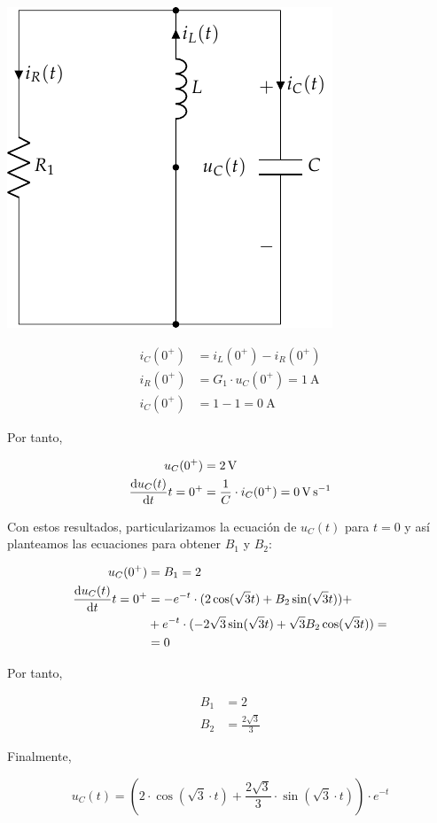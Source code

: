 \documentclass[12pt]{article}
\begin{document}
\begin{minipage}{0.3\textwidth}
\includegraphics[scale=0.8]{figs/FM_4_9_natural}
\end{minipage}
\begin{minipage}{0.7\textwidth}
\begin{align*}
  i_C(0^+) &= i_L(0^+) - i_R(0^+)\\
  i_R(0^+) &= G_1 \cdot u_C(0^+) = \SI{1}{\ampere}\\
  i_C(0^+) &= 1 - 1 = \SI{0}{\ampere}
\end{align*}
\end{minipage}

\bigskip

Por tanto,

\begin{align*}
  u_C(0^+) &= \SI{2}{\volt}\\
  \diff{u_C(t)}{t}{t = 0^+} &= \frac{1}{C} \cdot i_C(0^+) = \SI{0}{\volt\per\second}
\end{align*}

Con estos resultados, particularizamos la ecuación de $u_C(t)$ para $t = 0$ y así planteamos las ecuaciones para obtener $B_1$ y $B_2$:

\begin{align*}
  u_C(0^+) &= B_1 = 2\\
  \diff{u_C(t)}{t}{t = 0^+} &= -e^{-t} \cdot (2\cos(\sqrt{3}t) + B_2\sin(\sqrt{3}t)) +\\
           &+ e^{-t} \cdot (-2\sqrt{3}\sin(\sqrt{3}t) + \sqrt{3} B_2\cos(\sqrt{3}t)) =\\
           &= 0
\end{align*}

Por tanto,

\begin{align*}
  B_1 &= 2\\
  B_2 &= \frac{2\sqrt{3}}{3}
\end{align*}

Finalmente,

\begin{equation*}
  u_C(t) = (2 \cdot \cos(\sqrt{3} \cdot t) + \frac{2\sqrt{3}}{3} \cdot \sin(\sqrt{3} \cdot t)) \cdot e^{-t}
\end{equation*}


\clearpage
\end{document}
